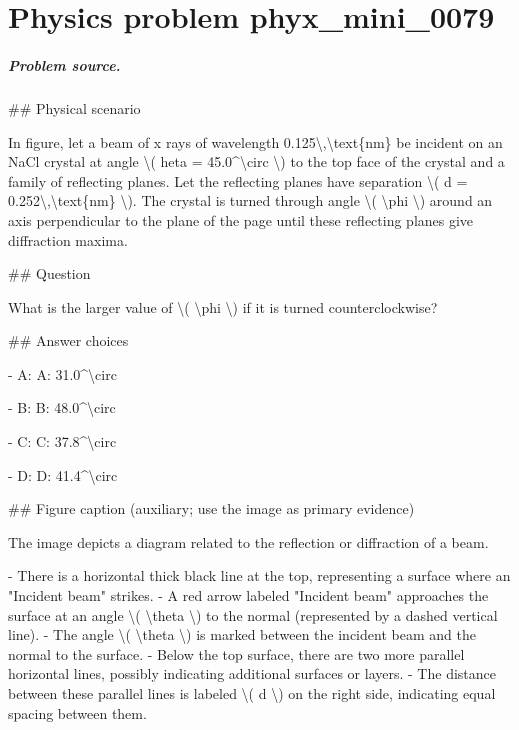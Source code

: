
\chapter{Physics problem phyx\_mini\_0079}
\label{ch:PhyXMiniProblems_problem_phyx_mini_0079}

\paragraph{Problem source.}
\#\# Physical scenario

In figure, let a beam of x rays of wavelength 0.125\textbackslash{},\textbackslash{}text\{nm\} be incident on an NaCl crystal at angle \textbackslash{}( 	heta = 45.0\textasciicircum{}\textbackslash{}circ \textbackslash{}) to the top face of the crystal and a family of reflecting planes. Let the reflecting planes have separation \textbackslash{}( d = 0.252\textbackslash{},\textbackslash{}text\{nm\} \textbackslash{}). The crystal is turned through angle \textbackslash{}( \textbackslash{}phi \textbackslash{}) around an axis perpendicular to the plane of the page until these reflecting planes give diffraction maxima.

\#\# Question

What is the larger value of \textbackslash{}( \textbackslash{}phi \textbackslash{}) if it is turned counterclockwise?

\#\# Answer choices

- A: A: 31.0\textasciicircum{}\textbackslash{}circ

- B: B: 48.0\textasciicircum{}\textbackslash{}circ

- C: C: 37.8\textasciicircum{}\textbackslash{}circ

- D: D: 41.4\textasciicircum{}\textbackslash{}circ

\#\# Figure caption (auxiliary; use the image as primary evidence)

The image depicts a diagram related to the reflection or diffraction of a beam. 

- There is a horizontal thick black line at the top, representing a surface where an "Incident beam" strikes.
- A red arrow labeled "Incident beam" approaches the surface at an angle \textbackslash{}( \textbackslash{}theta \textbackslash{}) to the normal (represented by a dashed vertical line).
- The angle \textbackslash{}( \textbackslash{}theta \textbackslash{}) is marked between the incident beam and the normal to the surface.
- Below the top surface, there are two more parallel horizontal lines, possibly indicating additional surfaces or layers.
- The distance between these parallel lines is labeled \textbackslash{}( d \textbackslash{}) on the right side, indicating equal spacing between them. 

